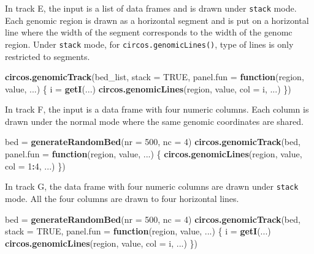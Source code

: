\documentclass[]{book}
\newenvironment{Shaded}{\begin{snugshade}}{\end{snugshade}}
\newcommand{\KeywordTok}[1]{\textcolor[rgb]{0.13,0.29,0.53}{\textbf{#1}}}
\newcommand{\DataTypeTok}[1]{\textcolor[rgb]{0.13,0.29,0.53}{#1}}
\newcommand{\DecValTok}[1]{\textcolor[rgb]{0.00,0.00,0.81}{#1}}
\newcommand{\StringTok}[1]{\textcolor[rgb]{0.31,0.60,0.02}{#1}}
\newcommand{\OtherTok}[1]{\textcolor[rgb]{0.56,0.35,0.01}{#1}}
\newcommand{\ControlFlowTok}[1]{\textcolor[rgb]{0.13,0.29,0.53}{\textbf{#1}}}
\newcommand{\OperatorTok}[1]{\textcolor[rgb]{0.81,0.36,0.00}{\textbf{#1}}}
\newcommand{\NormalTok}[1]{#1}
\begin{document}
In track E, the input is a list of data frames and is drawn under
\texttt{stack} mode. Each genomic region is drawn as a horizontal
segment and is put on a horizontal line where the width of the segment
corresponds to the width of the genomc region. Under \texttt{stack}
mode, for \texttt{circos.genomicLines()}, type of lines is only
restricted to segments.

\begin{Shaded}
\begin{Highlighting}[]
\KeywordTok{circos.genomicTrack}\NormalTok{(bed_list, }\DataTypeTok{stack =} \OtherTok{TRUE}\NormalTok{, }
    \DataTypeTok{panel.fun =} \ControlFlowTok{function}\NormalTok{(region, value, ...) \{}
\NormalTok{        i =}\StringTok{ }\KeywordTok{getI}\NormalTok{(...)}
        \KeywordTok{circos.genomicLines}\NormalTok{(region, value, }\DataTypeTok{col =}\NormalTok{ i, ...)}
\NormalTok{\})}
\end{Highlighting}
\end{Shaded}

In track F, the input is a data frame with four numeric columns. Each
column is drawn under the normal mode where the same genomic coordinates
are shared.

\begin{Shaded}
\begin{Highlighting}[]
\NormalTok{bed =}\StringTok{ }\KeywordTok{generateRandomBed}\NormalTok{(}\DataTypeTok{nr =} \DecValTok{500}\NormalTok{, }\DataTypeTok{nc =} \DecValTok{4}\NormalTok{)}
\KeywordTok{circos.genomicTrack}\NormalTok{(bed, }
    \DataTypeTok{panel.fun =} \ControlFlowTok{function}\NormalTok{(region, value, ...) \{}
        \KeywordTok{circos.genomicLines}\NormalTok{(region, value, }\DataTypeTok{col =} \DecValTok{1}\OperatorTok{:}\DecValTok{4}\NormalTok{, ...)}
\NormalTok{\})}
\end{Highlighting}
\end{Shaded}

In track G, the data frame with four numeric columns are drawn under
\texttt{stack} mode. All the four columns are drawn to four horizontal
lines.

\begin{Shaded}
\begin{Highlighting}[]
\NormalTok{bed =}\StringTok{ }\KeywordTok{generateRandomBed}\NormalTok{(}\DataTypeTok{nr =} \DecValTok{500}\NormalTok{, }\DataTypeTok{nc =} \DecValTok{4}\NormalTok{)}
\KeywordTok{circos.genomicTrack}\NormalTok{(bed, }\DataTypeTok{stack =} \OtherTok{TRUE}\NormalTok{, }
    \DataTypeTok{panel.fun =} \ControlFlowTok{function}\NormalTok{(region, value, ...) \{}
\NormalTok{        i =}\StringTok{ }\KeywordTok{getI}\NormalTok{(...)}
        \KeywordTok{circos.genomicLines}\NormalTok{(region, value, }\DataTypeTok{col =}\NormalTok{ i, ...)}
\NormalTok{\})}
\end{Highlighting}
\end{Shaded}
\end{document}

